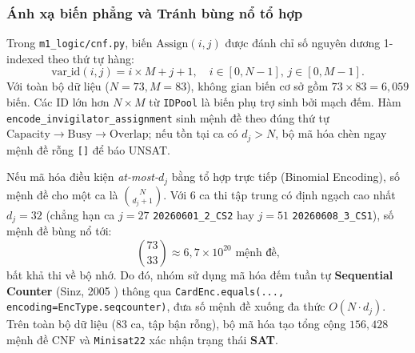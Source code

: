 \subsubsection{Ánh xạ biến phẳng và Tránh bùng nổ tổ hợp}
Trong \texttt{m1\_logic/cnf.py}, biến $\text{Assign}(i, j)$ được đánh chỉ số nguyên dương 1-indexed theo thứ tự hàng:
\begin{equation}
    \text{var\_id}(i, j) = i \times M + j + 1, \quad i \in [0, N-1], \, j \in [0, M-1].
\end{equation}
Với toàn bộ dữ liệu ($N = 73, M = 83$), không gian biến cơ sở gồm $73 \times 83 = 6{,}059$ biến. Các ID lớn hơn $N \times M$ từ \texttt{IDPool} là biến phụ trợ sinh bởi mạch đếm. Hàm \texttt{encode\_\allowbreak invigilator\_\allowbreak assignment} sinh mệnh đề theo đúng thứ tự $\text{Capacity} \to \text{Busy} \to \text{Overlap}$; nếu tồn tại ca có $d_j > N$, bộ mã hóa chèn ngay mệnh đề rỗng \texttt{[]} để báo UNSAT.

Nếu mã hóa điều kiện \textit{at-most-$d_j$} bằng tổ hợp trực tiếp (Binomial Encoding), số mệnh đề cho một ca là $\binom{N}{d_j + 1}$. Với $6$ ca thi tập trung có định ngạch cao nhất $d_j = 32$ (chẳng hạn ca $j = 27$ \texttt{20260601\_2\_CS2} hay $j = 51$ \texttt{20260608\_3\_CS1}), số mệnh đề bùng nổ tới:
\begin{equation}
    \binom{73}{33} \approx 6{,}7 \times 10^{20} \text{ mệnh đề,}
\end{equation}
bất khả thi về bộ nhớ. Do đó, nhóm sử dụng mã hóa đếm tuần tự \textbf{Sequential Counter} (Sinz, 2005 \cite{sinz2005}) thông qua \texttt{CardEnc.equals(..., \allowbreak encoding=EncType.seqcounter)}, đưa số mệnh đề xuống đa thức $O(N \cdot d_j)$. Trên toàn bộ dữ liệu ($83$ ca, tập bận rỗng), bộ mã hóa tạo tổng cộng $156{,}428$ mệnh đề CNF và \texttt{Minisat22} xác nhận trạng thái \textbf{SAT}.

